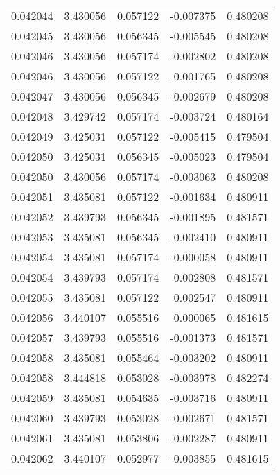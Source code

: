 \begin{tabular}{lrrrr}
0.042044    &  3.430056 &  0.057122 & -0.007375 &             0.480208 \\
0.042045    &  3.430056 &  0.056345 & -0.005545 &             0.480208 \\
0.042046    &  3.430056 &  0.057174 & -0.002802 &             0.480208 \\
0.042046    &  3.430056 &  0.057122 & -0.001765 &             0.480208 \\
0.042047    &  3.430056 &  0.056345 & -0.002679 &             0.480208 \\
0.042048    &  3.429742 &  0.057174 & -0.003724 &             0.480164 \\
0.042049    &  3.425031 &  0.057122 & -0.005415 &             0.479504 \\
0.042050    &  3.425031 &  0.056345 & -0.005023 &             0.479504 \\
0.042050    &  3.430056 &  0.057174 & -0.003063 &             0.480208 \\
0.042051    &  3.435081 &  0.057122 & -0.001634 &             0.480911 \\
0.042052    &  3.439793 &  0.056345 & -0.001895 &             0.481571 \\
0.042053    &  3.435081 &  0.056345 & -0.002410 &             0.480911 \\
0.042054    &  3.435081 &  0.057174 & -0.000058 &             0.480911 \\
0.042054    &  3.439793 &  0.057174 &  0.002808 &             0.481571 \\
0.042055    &  3.435081 &  0.057122 &  0.002547 &             0.480911 \\
0.042056    &  3.440107 &  0.055516 &  0.000065 &             0.481615 \\
0.042057    &  3.439793 &  0.055516 & -0.001373 &             0.481571 \\
0.042058    &  3.435081 &  0.055464 & -0.003202 &             0.480911 \\
0.042058    &  3.444818 &  0.053028 & -0.003978 &             0.482274 \\
0.042059    &  3.435081 &  0.054635 & -0.003716 &             0.480911 \\
0.042060    &  3.439793 &  0.053028 & -0.002671 &             0.481571 \\
0.042061    &  3.435081 &  0.053806 & -0.002287 &             0.480911 \\
0.042062    &  3.440107 &  0.052977 & -0.003855 &             0.481615 \\

\end{tabular}
